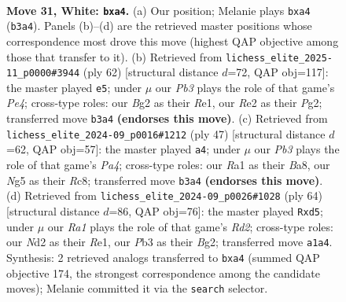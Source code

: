 \documentclass[11pt]{article}
\begin{document}
\begin{figure}[p]
\label{fig:thought-m58}
\end{figure}

\clearpage

\begin{figure}[p]\centering
\begin{subfigure}{0.46\textwidth}\centering
\resizebox{\linewidth}{!}{%
\newchessgame
\chessboard[
  setfen={1qb5/r4pkp/5np1/6N1/pp6/1P4P1/3NRPBP/R5K1 w - - 0 31},
  showmover=false,
  pgfstyle=straightmove, color=movearrow, markmove={b3-a4}
]}
\caption{}
\end{subfigure}\hfill
\begin{subfigure}{0.46\textwidth}\centering
\resizebox{\linewidth}{!}{%
\newchessgame
\chessboard[
  setfen={br1r4/5pk1/4pnp1/p1Np4/B3P3/5P2/PP1R1KP1/4R3 w - - 0 32},
  showmover=false,
  pgfstyle=straightmove, color=movearrow, markmove={e4-e5}
]}
\caption{}
\end{subfigure}
\\[4pt]
\begin{subfigure}{0.46\textwidth}\centering
\resizebox{\linewidth}{!}{%
\newchessgame
\chessboard[
  setfen={b1r3k1/5pp1/1Q3n1p/p2P4/2PN4/qP1B2P1/5PP1/4R1K1 b - - 3 24},
  showmover=false,
  pgfstyle=straightmove, color=movearrow, markmove={a5-a4}
]}
\caption{}
\end{subfigure}\hfill
\begin{subfigure}{0.46\textwidth}\centering
\resizebox{\linewidth}{!}{%
\newchessgame
\chessboard[
  setfen={1r4k1/q4pb1/1p4p1/r2p1n1p/P7/1QN3P1/3R1PBP/4R1K1 w - - 0 33},
  showmover=false,
  pgfstyle=straightmove, color=movearrow, markmove={d2-d5}
]}
\caption{}
\end{subfigure}
\caption{\textbf{Move 31, White: \texttt{bxa4}.} (a) Our position; Melanie plays \texttt{bxa4} (\texttt{b3a4}). Panels (b)--(d) are the retrieved master positions whose correspondence most drove this move (highest QAP objective among those that transfer to it). (b) Retrieved from \texttt{lichess\_elite\_2025-11\_p0000\#3944} (ply 62) [structural distance $d$=72, QAP obj=117]: the master played \texttt{e5}; under $\mu$ our \emph{Pb3} plays the role of that game's \emph{Pe4}; cross-type roles: our \emph{B}g2 as their \emph{R}e1, our \emph{R}e2 as their \emph{P}g2; transferred move \texttt{b3a4} \textbf{(endorses this move)}. (c) Retrieved from \texttt{lichess\_elite\_2024-09\_p0016\#1212} (ply 47) [structural distance $d$=62, QAP obj=57]: the master played \texttt{a4}; under $\mu$ our \emph{Pb3} plays the role of that game's \emph{Pa4}; cross-type roles: our \emph{R}a1 as their \emph{B}a8, our \emph{N}g5 as their \emph{R}c8; transferred move \texttt{b3a4} \textbf{(endorses this move)}. (d) Retrieved from \texttt{lichess\_elite\_2024-09\_p0026\#1028} (ply 64) [structural distance $d$=86, QAP obj=76]: the master played \texttt{Rxd5}; under $\mu$ our \emph{Ra1} plays the role of that game's \emph{Rd2}; cross-type roles: our \emph{N}d2 as their \emph{R}e1, our \emph{P}b3 as their \emph{B}g2; transferred move \texttt{a1a4}. Synthesis: 2 retrieved analogs transferred to \texttt{bxa4} (summed QAP objective 174, the strongest correspondence among the candidate moves); Melanie committed it via the \texttt{search} selector.}
\label{fig:thought-m60}
\end{figure}
\end{document}
